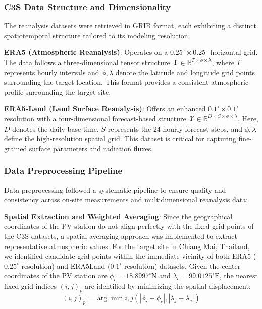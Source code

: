 \documentclass[conference]{IEEEtran}
\begin{document}
	\subsubsection{\textbf{C3S Data Structure and Dimensionality}}
	The reanalysis datasets were retrieved in GRIB format, each exhibiting a distinct spatiotemporal structure tailored to its modeling resolution:
	
	\textbf{ERA5 (Atmospheric Reanalysis)}: Operates on a $0.25^\circ\times0.25^\circ$ horizontal grid. The data follows a three-dimensional tensor structure $\mathcal{X} \in \mathbb{R}^{T \times \phi \times \lambda}$, where $T$ represents hourly intervals and $\phi, \lambda$ denote the latitude and longitude grid points surrounding the target location. This format provides a consistent atmospheric profile surrounding the target site.
	
	\textbf{ERA5-Land (Land Surface Reanalysis)}: Offers an enhanced $0.1^\circ \times 0.1^\circ$ resolution with a four-dimensional forecast-based structure $\mathcal{X} \in \mathbb{R}^{D \times S \times \phi \times \lambda}$. Here, $D$ denotes the daily base time, $S$ represents the 24 hourly forecast steps, and $\phi, \lambda$ define the high-resolution spatial grid. This dataset is critical for capturing fine-grained surface parameters and radiation fluxes.
	
	\subsubsection{\textbf{Data Preprocessing Pipeline}}
	Data preprocessing followed a systematic pipeline to ensure quality and consistency across on-site measurements and multidimensional reanalysis data:
	
	\textbf{Spatial Extraction and Weighted Averaging}: Since the geographical coordinates of the PV station do not align perfectly with the fixed grid points of the C3S datasets, a spatial averaging approach was implemented to extract representative atmospheric values. For the target site in Chiang Mai, Thailand, we identified candidate grid points within the immediate vicinity of both ERA5 ($0.25^\circ$ resolution) and ERA5Land ($0.1^\circ$ resolution) datasets. Given the center coordinates of the PV station are $\phi_c=18.8997^\circ\text{N}$ and $\lambda_c=99.0125^\circ\text{E}$, the nearest fixed grid indices $(i, j)_{p}$ are identified by minimizing the spatial displacement:
		\begin{equation*}
			(i,j)_{p} = \arg\min{i, j} \left( |\phi_i - \phi_c|,\allowbreak |\lambda_j - \lambda_{c}| \right)
		\end{equation*}
		
\end{document}
